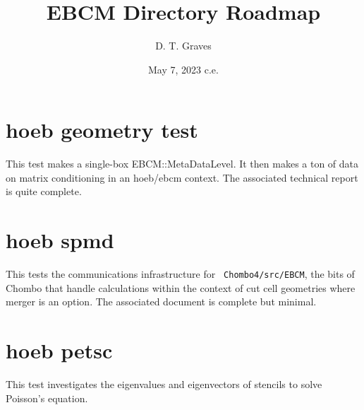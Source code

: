 \documentclass{article}
\begin{document}
\title{EBCM Directory Roadmap}
\author{ D. T. Graves }
\date{May 7, 2023 c.e.}
\maketitle

\section{hoeb geometry test}

This test makes a single-box EBCM::MetaDataLevel.  It then makes a ton
of data on matrix conditioning in an hoeb/ebcm context.    The
associated technical report is quite complete.

\section{hoeb spmd}

This tests the communications infrastructure for {\tt
Chombo4/src/EBCM}, the bits of Chombo that handle calculations
within the context of  cut cell geometries where merger is an option.
The associated document is complete but minimal.


\section{hoeb petsc}

This test investigates the eigenvalues and eigenvectors of stencils to
solve Poisson's equation.
\end{document}
